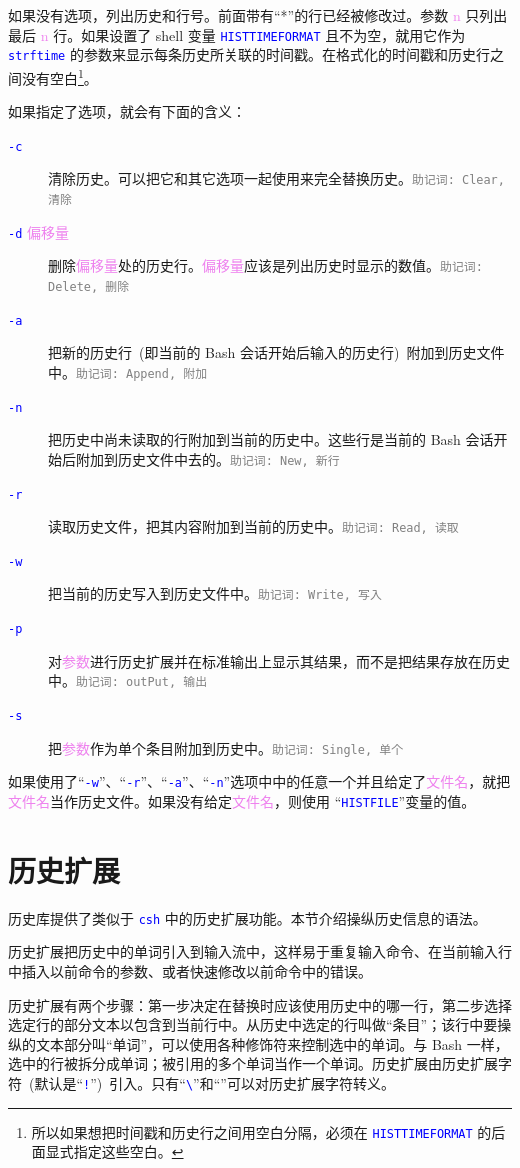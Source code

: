 \documentclass[openany,notitlepage]{book}
\newcommand{\mnemonic}[1]{\textcolor{gray}{{\scriptsize\tt 助记词: #1}}}
\newcommand{\code}[1]{\textcolor{blue}{{\tt #1}}}
\newcommand{\hs}[1]{{\textcolor{violet}{#1}}}
\begin{document}
\begin{CJK}{UTF8}{song}
如果没有选项，列出历史和行号。前面带有``*''的行已经被修改过。参数 \hs{n} 只列出最后 \hs{n} 行。如果设置了 shell 变量 \code{HISTTIMEFORMAT} 且不为空，就用它作为 \code{strftime} 的参数来显示每条历史所关联的时间戳。在格式化的时间戳和历史行之间没有空白\footnote{所以如果想把时间戳和历史行之间用空白分隔，必须在 \code{HISTTIMEFORMAT} 的后面显式指定这些空白。}。

如果指定了选项，就会有下面的含义：
\begin{description}
    \item[\code{-c}] 清除历史。可以把它和其它选项一起使用来完全替换历史。\mnemonic{Clear, 清除}
    \item[\code{-d} \hs{偏移量}] 删除\hs{偏移量}处的历史行。\hs{偏移量}应该是列出历史时显示的数值。\mnemonic{Delete, 删除}
    \item[\code{-a}] 把新的历史行~(即当前的 Bash 会话开始后输入的历史行)~附加到历史文件中。\mnemonic{Append, 附加}
    \item[\code{-n}] 把历史中尚未读取的行附加到当前的历史中。这些行是当前的 Bash 会话开始后附加到历史文件中去的。\mnemonic{New, 新行}
    \item[\code{-r}] 读取历史文件，把其内容附加到当前的历史中。\mnemonic{Read, 读取}
    \item[\code{-w}] 把当前的历史写入到历史文件中。\mnemonic{Write, 写入}
    \item[\code{-p}] 对\hs{参数}进行历史扩展并在标准输出上显示其结果，而不是把结果存放在历史中。\mnemonic{outPut, 输出}
    \item[\code{-s}] 把\hs{参数}作为单个条目附加到历史中。\mnemonic{Single, 单个}
\end{description}
如果使用了``\code{-w}''、``\code{-r}''、``\code{-a}''、``\code{-n}''选项中中的任意一个并且给定了\hs{文件名}，就把\hs{文件名}当作历史文件。如果没有给定\hs{文件名}，则使用 ``\code{HISTFILE}''变量的值。


\section{历史扩展}\label{history-expansion} %

历史库提供了类似于 \code{csh} 中的历史扩展功能。本节介绍操纵历史信息的语法。

历史扩展把历史中的单词引入到输入流中，这样易于重复输入命令、在当前输入行中插入以前命令的参数、或者快速修改以前命令中的错误。

历史扩展有两个步骤：第一步决定在替换时应该使用历史中的哪一行，第二步选择选定行的部分文本以包含到当前行中。从历史中选定的行叫做``条目''；该行中要操纵的文本部分叫``单词''，可以使用各种修饰符来控制选中的单词。与 Bash 一样，选中的行被拆分成单词；被引用的多个单词当作一个单词。历史扩展由历史扩展字符~(默认是``\code{!}'')~引入。只有``\code{\textbackslash}''和``\code{}''可以对历史扩展字符转义。


\end{CJK}
\end{document}
